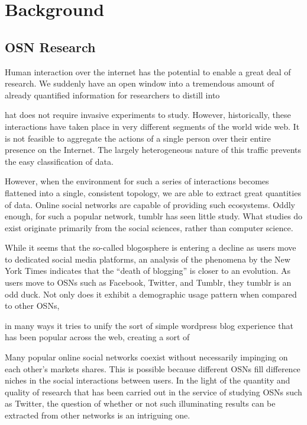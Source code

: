 \section{Background}
\label{sec:-back}
\subsection{OSN Research}


Human interaction over the internet has the potential to enable a great 
deal of research.  We suddenly have an open window into a tremendous 
amount of already quantified information for researchers to distill into 


hat does not require invasive experiments to study.  However, 
historically, these interactions have taken place in very different 
segments of the world wide web.  It is not feasible to aggregate the 
actions of a single person over their entire presence on the Internet.  
The largely heterogeneous nature of this traffic prevents the easy 
classification of data.  

However, when the environment for such a series 
of interactions becomes flattened into a single, consistent topology, 
we are able to extract great quantities of data.  Online social 
networks are capable of providing such ecosystems.  Oddly enough, 
for such a popular network, tumblr has seen little study.  What studies 
do exist originate primarily from the social sciences, rather than computer 
science. 


 



While it seems that the so-called blogosphere is entering a decline 
as users move to dedicated social media platforms, an analysis of the 
phenomena by the New York Times\cite{kopytoff2011blogs} indicates that 
the ``death of blogging'' is closer to an evolution.  As users move to 
OSNs such as Facebook, Twitter, and Tumblr, they
tumblr is an odd duck.  Not only does it exhibit a demographic usage 
pattern when compared to other OSNs,

 in many ways it tries to unify 
the sort of simple wordpress blog experience that has been popular 
across the web, creating a sort of 



Many popular online social networks coexist without necessarily 
impinging on each other's markets shares.  This is possible because 
different OSNs fill difference niches in the social interactions 
between users.  In the light of the quantity and quality of research 
that has been carried out in the service of studying OSNs such as 
Twitter, the question of whether or not such illuminating results 
can be extracted from other networks is an intriguing one.  

